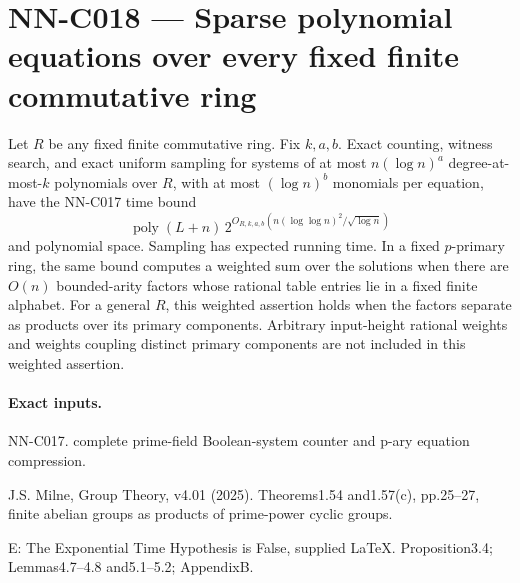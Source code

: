 \section{NN-C018 --- Sparse polynomial equations over every fixed finite commutative ring}
\begin{proposition}[NN-C018]
Let $R$ be any fixed finite commutative ring. Fix $k,a,b$. Exact counting, witness search, and exact uniform sampling for systems of at most $n(\log n)^a$ degree-at-most-$k$ polynomials over $R$, with at most $(\log n)^b$ monomials per equation, have the NN-C017 time bound
\[
 \operatorname{poly}(L+n)\,
 2^{O_{R,k,a,b}(n(\log\log n)^2/\sqrt{\log n})}
\]
and polynomial space. Sampling has expected running time. In a fixed $p$-primary ring, the same bound computes a weighted sum over the solutions when there are $O(n)$ bounded-arity factors whose rational table entries lie in a fixed finite alphabet. For a general $R$, this weighted assertion holds when the factors separate as products over its primary components. Arbitrary input-height rational weights and weights coupling distinct primary components are not included in this weighted assertion.
\end{proposition}
\paragraph{Exact inputs.}
NN-C017. complete prime-field Boolean-system counter and p-ary equation compression.

J.S. Milne, Group Theory, v4.01 (2025). Theorems1.54 and1.57(c), pp.25--27, finite abelian groups as products of prime-power cyclic groups.

E: The Exponential Time Hypothesis is False, supplied LaTeX. Proposition3.4; Lemmas4.7--4.8 and5.1--5.2; AppendixB.

